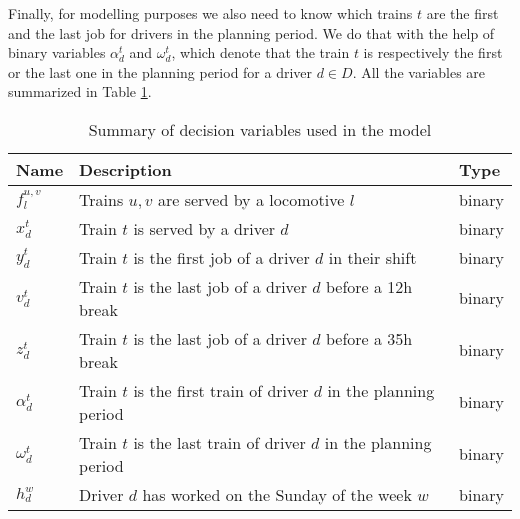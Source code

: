 Finally, for modelling purposes we also need to know which trains $t$ are the first and the last job for drivers in the planning period. We do that with the help of binary variables $\alpha^{t}_d$ and $\omega^{t}_d$, which denote that the train $t$ is respectively the first or the last one in the planning period for a driver $d \in D$. All the variables are summarized in Table \ref{tab:variable_definitions}.
\begin{table}[htbp]
 \caption{Summary of decision variables used in the model}
  \centering
  \begin{tabular}{lll}
  	\toprule
  	Name            & Description                                                       & Type   \\ \midrule
  	$f^{u, v}_l$    & Trains $u, v$ are served by a locomotive $l$                      & binary \\
  	$x^t_{d}$       & Train  $t$ is served by a driver $d$                              & binary \\
  	$y^t_{d}$       & Train $t$ is the first job of a driver $d$ in their shift         & binary \\
  	$v^t_{d}$       & Train $t$ is the last job of a driver $d$ before a 12h break      & binary \\
  	$z^t_{d}$       & Train $t$ is the last job of a driver $d$ before a 35h break      & binary \\
  	$\alpha^{t}_d$  & Train $t$ is the first train of driver $d$ in the planning period & binary \\
  	$\omega^{t}_d$  & Train $t$ is the last train of driver $d$ in the planning period  & binary \\
  	$h^{w}_{d}$      & Driver $d$ has worked on the Sunday of the week $w$               & binary \\ \bottomrule
  \end{tabular}
  \label{tab:variable_definitions}
\end{table}


\newpage
